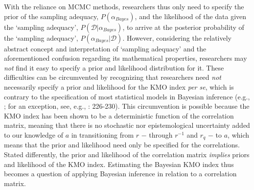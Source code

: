 \documentclass[
  10pt,
  a4paper,
  twoside]{article}
\begin{document}
With the reliance on MCMC methods, researchers thus only need to specify the prior of the sampling adequacy, \(P(\alpha_{Bayes})\), and the likelihood of the data given the `sampling adequacy', \(P(\mathcal{D} | \alpha_{Bayes})\), to arrive at the posterior probability of the `sampling adequacy', \(P(\alpha_{Bayes} | \mathcal{D})\). However, considering the relatively abstract concept and interpretation of `sampling adequacy' and the aforementioned confusion regarding its mathematical properties, researchers may \emph{not} find it easy to specify a prior and likelihood distribution for it. These difficulties can be circumvented by recognizing that researchers need \emph{not} necessarily specify a prior and likelihood for the KMO index \emph{per se}, which is contrary to the specification of most statistical models in Bayesian inference (e.g., ; for an exception, see, e.g., : 226-230). This circumvention is possible because the KMO index has been shown to be a deterministic function of the correlation matrix, meaning that there is no stochastic nor epistemological uncertainty added to our knowledge of \(a\) in transitioning from \(r\) \(-\) through \(r^{-1}\) and \(r_q\) \(-\) to \(a\), which means that the prior and likelihood need only be specified for the correlations. Stated differently, the prior and likelihood of the correlation matrix \emph{implies} priors and likelihood of the KMO index. Estimating the Bayesian KMO index thus becomes a question of applying Bayesian inference in relation to a correlation matrix.
\end{document}
